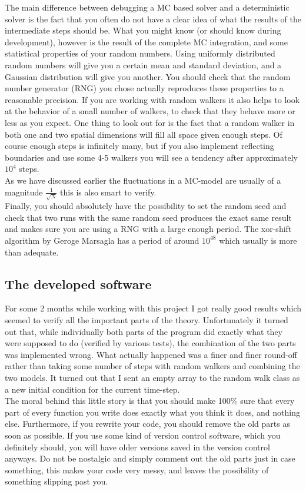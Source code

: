The main difference between debugging a MC based solver and a deterministic solver is the fact that you often do not have a clear idea of what the results of the intermediate steps should be. 
What you might know (or should know during development), however is the result of the complete MC integration, and some statistical properties of your random numbers. 
Using uniformly distributed random numbers will give you a certain mean and standard deviation, and a Gaussian distribution will give you another. 
You should check that the random number generator (RNG) you chose actually reproduces these properties to a reasonable precision. 
If you are working with random walkers it also helps to look at the behavior of a small number of walkers, to check that they behave more or less as you expect. 
One thing to look out for is the fact that a random walker in both one and two spatial dimensions will fill all space given enough steps. 
Of course enough steps is infinitely many, but if you also implement reflecting boundaries and use some 4-5 walkers you will see a tendency after approximately $10^4$ steps. \\
As we have discussed earlier the fluctuations in a MC-model are usually of a magnitude $\frac{1}{\sqrt N}$ this is also smart to verify. \\
Finally, you should absolutely have the possibility to set the random seed and check that two runs with the same random seed produces the exact same result and makes sure you are using a RNG with a large enough period. The xor-shift algorithm by Geroge Marsagla \cite{} has a period of around $10^{48}$ which usually is more than adequate.

\subsection{The developed software}

For some 2 months while working with this project I got really good results which seemed to verify all the important parts of the theory. 
Unfortunately it turned out that, while individually both parts of the program did exactly what they were supposed to do (verified by various tests), the combination of the two parts was implemented wrong. 
What actually happened was a finer and finer round-off rather than taking some number of steps with random walkers and combining the two models. 
It turned out that I sent an empty array to the random walk class as a new initial condition for the current time-step. \\
The moral behind this little story is that you should make 100\% sure that every part of every function you write does exactly what you think it does, and nothing else. 
Furthermore, if you rewrite your code, you should remove the old parts as soon as possible. If you use some kind of version control software, which you definitely should, you will have older versions saved in the version control anyways. Do not be nostalgic and simply comment out the old parts just in case something, this makes your code very messy, and leaves the possibility of something slipping past you.

